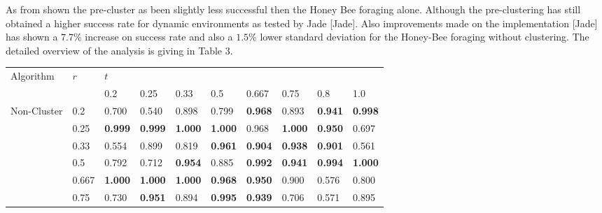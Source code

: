 \documentclass[12pt]{article}
\begin{document}
\par{As from shown the pre-cluster as been slightly less successful then the Honey Bee foraging alone. Although the pre-clustering has still obtained a higher success rate for dynamic environments as tested by Jade [Jade]. Also improvements made on the implementation [Jade] has shown a $7.7\%$ increase on success rate and also a $1.5\%$ lower standard deviation for the Honey-Bee foraging without clustering. The detailed overview of the analysis is giving in Table 3. }

\begin{table}[h]
\centering
\begin{tabular}{|l|l|l|l|l|l|l|l|l|l|}
\hline
\multirow{2}{*}{Algorithm}                         & \multirow{2}{*}{\hspace{0.017\linewidth}$r$} & \multicolumn{8}{l|}{\hspace{0.28\linewidth} $t$}                                                                                        \\ \cline{3-10} 
                                                   &                    & 0.2         & 0.25        & 0.33        & 0.5         & 0.667       & 0.75        & 0.8         & 1.0         \\ \hline
\multirow{8}{*}{Non-Cluster}                       & 0.2                & 0.700       & 0.540       & 0.898       & 0.799       & {\bf 0.968} & 0.893       & {\bf 0.941} & {\bf 0.998} \\
                                                   & 0.25               & {\bf 0.999} & {\bf 0.999} & {\bf 1.000}   & {\bf 1.000}   & 0.968       & {\bf 1.000}   & {\bf 0.950}       & 0.697       \\
                                                   & 0.33               & 0.554       & 0.899       & 0.819       & {\bf 0.961} & {\bf 0.904} & {\bf 0.938} & {\bf 0.901} & 0.561       \\
                                                   & 0.5                & 0.792       & 0.712       & {\bf 0.954}       & 0.885       & {\bf 0.992} & {\bf 0.941} & {\bf 0.994} & {\bf 1.000}   \\
                                                   & 0.667              & {\bf 1.000}   & {\bf 1.000}   & {\bf 1.000}   & {\bf 0.968} & {\bf 0.950} & 0.900       & 0.576       & 0.800       \\
                                                   & 0.75               & 0.730       & {\bf 0.951} & 0.894       & {\bf 0.995} & {\bf 0.939} & 0.706       & 0.571       & 0.895       \\

\end{tabular}
\end{table}
\end{document}
